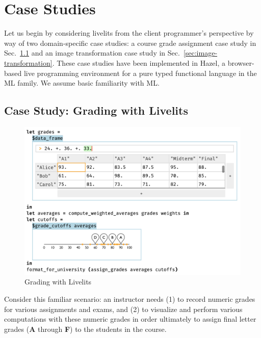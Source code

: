 \section{Case Studies}\label{sec:case-studies}
Let us begin by considering livelits from the client programmer's perspective by way of
two domain-specific case studies:
a course grade assignment case study in Sec.~\ref{sec:live-grading}
and an image transformation case study in Sec.~\ref{sec:image-transformation}.
These case studies have been implemented
in Hazel, a browser-based live programming environment for a pure typed functional language in the
ML family. We assume basic familiarity with ML.

\subsection{Case Study: Grading with Livelits}\label{sec:live-grading}
\begin{figure}
    \includegraphics[width=30pc]{grade-cutoff-livelit.png}
\caption{Grading with Livelits}
\label{fig:grading}
\end{figure}

Consider this familiar scenario: an instructor needs
(1) to record numeric grades for various assignments and exams, and
(2) to visualize and perform various computations with these numeric grades
in order ultimately to assign final letter grades (\textbf{A} through \textbf{F}) to the students in the course.

